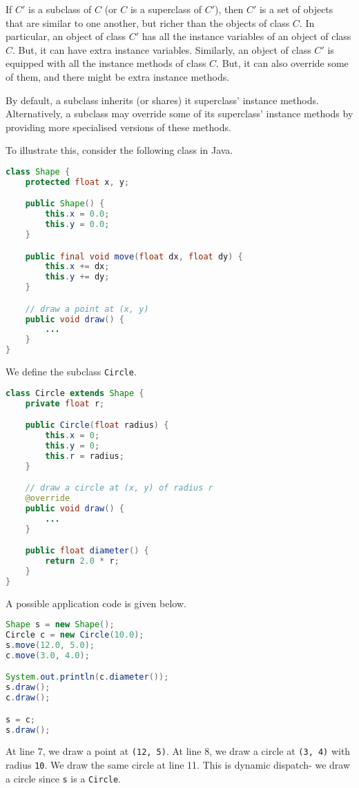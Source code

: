 \documentclass[a4paper, openany]{memoir}
\begin{document}
If $C'$ is a subclass of $C$ (or $C$ is a superclass of $C'$), then $C'$ is a set of objects that are similar to one another, but richer than the objects of class $C$. In particular, an object of class $C'$ has all the instance variables of an object of class $C$. But, it can have extra instance variables. Similarly, an object of class $C'$ is equipped with all the instance methods of class $C$. But, it can also override some of them, and there might be extra instance methods.

By default, a subclass inherits (or shares) it superclass' instance methods. Alternatively, a subclass may override some of its superclass' instance methods by providing more specialised versions of these methods.

To illustrate this, consider the following class in Java.
\begin{lstlisting}[language=java]
class Shape {
    protected float x, y;

    public Shape() {
        this.x = 0.0;
        this.y = 0.0;
    }

    public final void move(float dx, float dy) {
        this.x += dx;
        this.y += dy;
    }

    // draw a point at (x, y)
    public void draw() {
        ...
    }
}
\end{lstlisting}
We define the subclass \texttt{Circle}.
\begin{lstlisting}[language=java]
class Circle extends Shape {
    private float r;

    public Circle(float radius) {
        this.x = 0;
        this.y = 0;
        this.r = radius;
    }

    // draw a circle at (x, y) of radius r
    @override
    public void draw() {
        ...
    }

    public float diameter() {
        return 2.0 * r;
    }
}
\end{lstlisting}
A possible application code is given below.
\begin{lstlisting}[language=java]
Shape s = new Shape();
Circle c = new Circle(10.0);
s.move(12.0, 5.0);
c.move(3.0, 4.0);

System.out.println(c.diameter());
s.draw();
c.draw();

s = c;
s.draw();
\end{lstlisting}
At line 7, we draw a point at \texttt{(12, 5)}. At line 8, we draw a circle at \texttt{(3, 4)} with radius \texttt{10}. We draw the same circle at line 11. This is dynamic dispatch- we draw a circle since \texttt{s} is a \texttt{Circle}.
\end{document}
